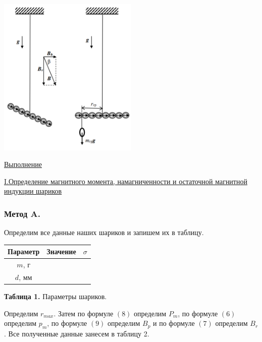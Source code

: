 \documentclass{article}
\begin{document}
\begin{center}
    \includegraphics[width=0.5\textwidth]{Bver.png}
\end{center}

\begin{center}
    \raggedleft
        \underline{\underline{\LARGE {Выполнение}}}
\end{center}

\begin{center}
    \underline{\large {\RN{1}.Определение магнитного момента, намагниченности и остаточной магнитной индукции шариков}}
\end{center}

\subsubsection*{Метод A. }
Определим все данные наших шариков и запишем их в таблицу.

\begin{center}
    \begin{tabular}{|c|c|c|}
        \hline
        Параметр & Значение & $\sigma$ \\
        \hline
        $m$, г &  &  \\
        \hline
        $d$, мм & &  \\
        \hline
    \end{tabular}
    
    \textbf{Таблица 1.} Параметры шариков.
\end{center}

Определим $r_{max}$. Затем по формуле $(8)$ определим $P_m$, по формуле $(6)$ определим $p_m$, по формуле $(9)$ определим $B_p$ и по формуле $(7)$ определим $B_r$. Все полученные данные занесем в таблицу 2.
\end{document}
